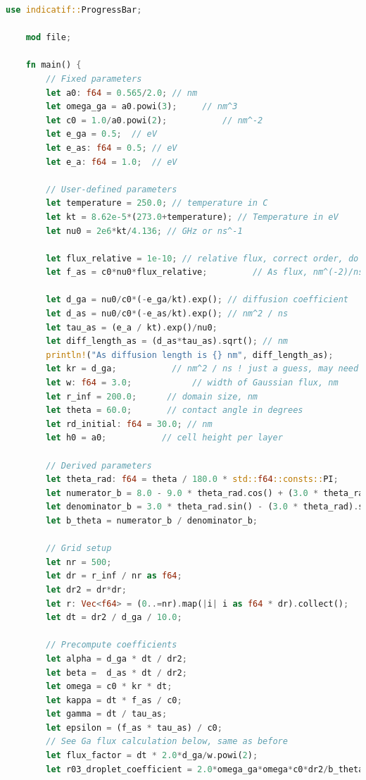 \documentclass[14pt,oneside]{extarticle}
\begin{document}
\begin{lstlisting}[language=Rust]
    use indicatif::ProgressBar;

    mod file;
    
    fn main() {
        // Fixed parameters
        let a0: f64 = 0.565/2.0; // nm
        let omega_ga = a0.powi(3);     // nm^3
        let c0 = 1.0/a0.powi(2);           // nm^-2
        let e_ga = 0.5;  // eV
        let e_as: f64 = 0.5; // eV
        let e_a: f64 = 1.0;  // eV
    
        // User-defined parameters
        let temperature = 250.0; // temperature in C
        let kt = 8.62e-5*(273.0+temperature); // Temperature in eV
        let nu0 = 2e6*kt/4.136; // GHz or ns^-1
    
        let flux_relative = 1e-10; // relative flux, correct order, do not change the order
        let f_as = c0*nu0*flux_relative;         // As flux, nm^(-2)/ns
    
        let d_ga = nu0/c0*(-e_ga/kt).exp(); // diffusion coefficient
        let d_as = nu0/c0*(-e_as/kt).exp(); // nm^2 / ns
        let tau_as = (e_a / kt).exp()/nu0;
        let diff_length_as = (d_as*tau_as).sqrt(); // nm
        println!("As diffusion length is {} nm", diff_length_as);
        let kr = d_ga;           // nm^2 / ns ! just a guess, may need to change
        let w: f64 = 3.0;            // width of Gaussian flux, nm
        let r_inf = 200.0;      // domain size, nm
        let theta = 60.0;       // contact angle in degrees
        let rd_initial: f64 = 30.0; // nm
        let h0 = a0;           // cell height per layer
    
        // Derived parameters
        let theta_rad: f64 = theta / 180.0 * std::f64::consts::PI;
        let numerator_b = 8.0 - 9.0 * theta_rad.cos() + (3.0 * theta_rad).cos();
        let denominator_b = 3.0 * theta_rad.sin() - (3.0 * theta_rad).sin();
        let b_theta = numerator_b / denominator_b;
    
        // Grid setup
        let nr = 500;
        let dr = r_inf / nr as f64;
        let dr2 = dr*dr;
        let r: Vec<f64> = (0..=nr).map(|i| i as f64 * dr).collect();
        let dt = dr2 / d_ga / 10.0;
    
        // Precompute coefficients
        let alpha = d_ga * dt / dr2;
        let beta =  d_as * dt / dr2;
        let omega = c0 * kr * dt;
        let kappa = dt * f_as / c0;
        let gamma = dt / tau_as;
        let epsilon = (f_as * tau_as) / c0;
        // See Ga flux calculation below, same as before
        let flux_factor = dt * 2.0*d_ga/w.powi(2);
        let r03_droplet_coefficient = 2.0*omega_ga*omega*c0*dr2/b_theta;
    

\end{lstlisting}
\end{document}
